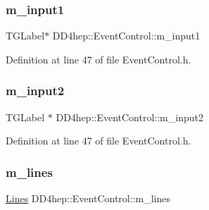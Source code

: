 \hypertarget{class_d_d4hep_1_1_event_control_ac057e1afd1f6e5f3490a6e2b35dc6caa}{}\label{class_d_d4hep_1_1_event_control_ac057e1afd1f6e5f3490a6e2b35dc6caa} 
\subsubsection{\texorpdfstring{m\+\_\+input1}{m\_input1}}
{\footnotesize\ttfamily T\+G\+Label$\ast$ D\+D4hep\+::\+Event\+Control\+::m\+\_\+input1\hspace{0.3cm}{\ttfamily [private]}}



Definition at line 47 of file Event\+Control.\+h.

\hypertarget{class_d_d4hep_1_1_event_control_a1d9b69907b96154bc0cca2b7619b903b}{}\label{class_d_d4hep_1_1_event_control_a1d9b69907b96154bc0cca2b7619b903b} 
\subsubsection{\texorpdfstring{m\+\_\+input2}{m\_input2}}
{\footnotesize\ttfamily T\+G\+Label $\ast$ D\+D4hep\+::\+Event\+Control\+::m\+\_\+input2\hspace{0.3cm}{\ttfamily [private]}}



Definition at line 47 of file Event\+Control.\+h.

\hypertarget{class_d_d4hep_1_1_event_control_a773981f8dbddb1f17a2f7801a62206bd}{}\label{class_d_d4hep_1_1_event_control_a773981f8dbddb1f17a2f7801a62206bd} 
\subsubsection{\texorpdfstring{m\+\_\+lines}{m\_lines}}
{\footnotesize\ttfamily \hyperlink{class_d_d4hep_1_1_event_control_a662fec8b3e1e89af1cf704e41cb7df78}{Lines} D\+D4hep\+::\+Event\+Control\+::m\+\_\+lines\hspace{0.3cm}{\ttfamily [private]}}



